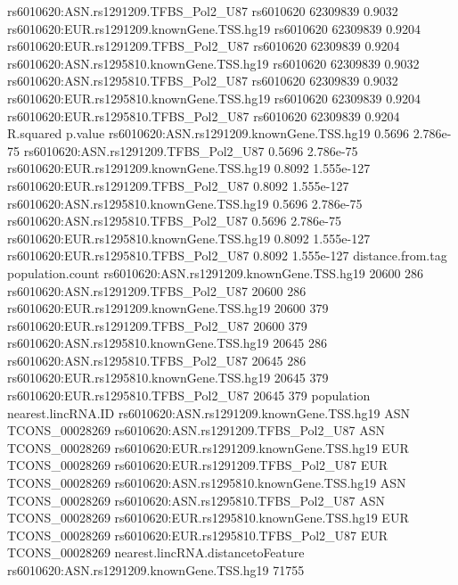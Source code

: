 \documentclass[a4paper]{article}
\begin{document}
\begin{Schunk}
\begin{Soutput}
rs6010620:ASN.rs1291209.TFBS_Pol2_U87       rs6010620         62309839  0.9032
rs6010620:EUR.rs1291209.knownGene.TSS.hg19  rs6010620         62309839  0.9204
rs6010620:EUR.rs1291209.TFBS_Pol2_U87       rs6010620         62309839  0.9204
rs6010620:ASN.rs1295810.knownGene.TSS.hg19  rs6010620         62309839  0.9032
rs6010620:ASN.rs1295810.TFBS_Pol2_U87       rs6010620         62309839  0.9032
rs6010620:EUR.rs1295810.knownGene.TSS.hg19  rs6010620         62309839  0.9204
rs6010620:EUR.rs1295810.TFBS_Pol2_U87       rs6010620         62309839  0.9204
                                           R.squared    p.value
rs6010620:ASN.rs1291209.knownGene.TSS.hg19    0.5696  2.786e-75
rs6010620:ASN.rs1291209.TFBS_Pol2_U87         0.5696  2.786e-75
rs6010620:EUR.rs1291209.knownGene.TSS.hg19    0.8092 1.555e-127
rs6010620:EUR.rs1291209.TFBS_Pol2_U87         0.8092 1.555e-127
rs6010620:ASN.rs1295810.knownGene.TSS.hg19    0.5696  2.786e-75
rs6010620:ASN.rs1295810.TFBS_Pol2_U87         0.5696  2.786e-75
rs6010620:EUR.rs1295810.knownGene.TSS.hg19    0.8092 1.555e-127
rs6010620:EUR.rs1295810.TFBS_Pol2_U87         0.8092 1.555e-127
                                           distance.from.tag population.count
rs6010620:ASN.rs1291209.knownGene.TSS.hg19             20600              286
rs6010620:ASN.rs1291209.TFBS_Pol2_U87                  20600              286
rs6010620:EUR.rs1291209.knownGene.TSS.hg19             20600              379
rs6010620:EUR.rs1291209.TFBS_Pol2_U87                  20600              379
rs6010620:ASN.rs1295810.knownGene.TSS.hg19             20645              286
rs6010620:ASN.rs1295810.TFBS_Pol2_U87                  20645              286
rs6010620:EUR.rs1295810.knownGene.TSS.hg19             20645              379
rs6010620:EUR.rs1295810.TFBS_Pol2_U87                  20645              379
                                           population nearest.lincRNA.ID
rs6010620:ASN.rs1291209.knownGene.TSS.hg19        ASN     TCONS_00028269
rs6010620:ASN.rs1291209.TFBS_Pol2_U87             ASN     TCONS_00028269
rs6010620:EUR.rs1291209.knownGene.TSS.hg19        EUR     TCONS_00028269
rs6010620:EUR.rs1291209.TFBS_Pol2_U87             EUR     TCONS_00028269
rs6010620:ASN.rs1295810.knownGene.TSS.hg19        ASN     TCONS_00028269
rs6010620:ASN.rs1295810.TFBS_Pol2_U87             ASN     TCONS_00028269
rs6010620:EUR.rs1295810.knownGene.TSS.hg19        EUR     TCONS_00028269
rs6010620:EUR.rs1295810.TFBS_Pol2_U87             EUR     TCONS_00028269
                                           nearest.lincRNA.distancetoFeature
rs6010620:ASN.rs1291209.knownGene.TSS.hg19                             71755

\end{Soutput}
\end{Schunk}
\end{document}
